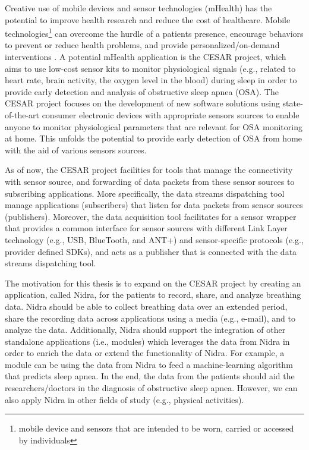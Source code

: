 Creative use of mobile devices and sensor technologies (mHealth) has the potential to improve health research and reduce the cost of healthcare. Mobile technologies\footnote{mobile device and sensors that are intended to be worn, carried or accessed by individuals} can overcome the hurdle of a patients presence, encourage behaviors to prevent or reduce health problems, and provide personalized/on-demand interventions \cite{kumar2013mobile}. A potential mHealth application is the CESAR project, which aims to use low-cost sensor kits to monitor physiological signals (e.g., related to heart rate, brain activity, the oxygen level in the blood) during sleep in order to provide early detection and analysis of obstructive sleep apnea (OSA). The CESAR project \cite{cesar} focuses on the development of new software solutions using state-of-the-art consumer electronic devices with appropriate sensors sources to enable anyone to monitor physiological parameters that are relevant for OSA monitoring at home. This unfolds the potential to provide early detection of OSA from home with the aid of various sensors sources. 

As of now, the CESAR project facilities for tools that manage the connectivity with sensor source, and forwarding of data packets from these sensor sources to subscribing applications. More specifically, the data streams dispatching tool \cite{daniel} manage applications (subscribers) that listen for data packets from sensor sources (publishers). Moreover, the data acquisition tool \cite{gjoby} facilitates for a sensor wrapper that provides a common interface for sensor sources with different Link Layer technology (e.g., USB, BlueTooth, and ANT+) and sensor-specific protocols (e.g., provider defined SDKs), and acts as a publisher that is connected with the data streams dispatching tool. 

The motivation for this thesis is to expand on the CESAR project by creating an application, called Nidra, for the patients to record, share, and analyze breathing data. Nidra should be able to collect breathing data over an extended period, share the recording data across applications using a media (e.g., e-mail), and to analyze the data. Additionally, Nidra should support the integration of other standalone applications (i.e., modules) which leverages the data from Nidra in order to enrich the data or extend the functionality of Nidra. For example, a module can be using the data from Nidra to feed a machine-learning algorithm that predicts sleep apnea. In the end, the data from the patients should aid the researchers/doctors in the diagnosis of obstructive sleep apnea. However, we can also apply Nidra in other fields of study (e.g., physical activities).